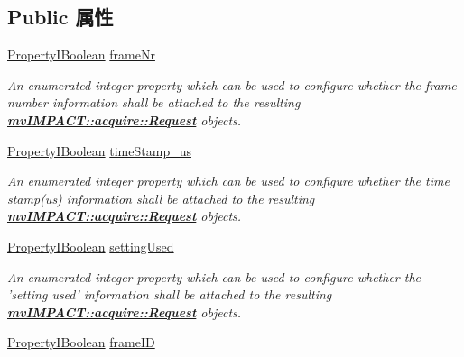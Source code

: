 \subsection*{Public 属性}
\begin{DoxyCompactItemize}
\item 
\hyperlink{group___common_interface_ga44f9437e24b21b6c93da9039ec6786aa}{Property\+I\+Boolean} \hyperlink{classmv_i_m_p_a_c_t_1_1acquire_1_1_request_info_configuration_af09762397b7527006125da34612a33a3}{frame\+Nr}
\begin{DoxyCompactList}\small\item\em An enumerated integer property which can be used to configure whether the frame number information shall be attached to the resulting {\bfseries \hyperlink{classmv_i_m_p_a_c_t_1_1acquire_1_1_request}{mv\+I\+M\+P\+A\+C\+T\+::acquire\+::\+Request}} objects. \end{DoxyCompactList}\item 
\hyperlink{group___common_interface_ga44f9437e24b21b6c93da9039ec6786aa}{Property\+I\+Boolean} \hyperlink{classmv_i_m_p_a_c_t_1_1acquire_1_1_request_info_configuration_a2124f5ba9dc92108fcdb6fe83dd2b9f5}{time\+Stamp\+\_\+us}
\begin{DoxyCompactList}\small\item\em An enumerated integer property which can be used to configure whether the time stamp(us) information shall be attached to the resulting {\bfseries \hyperlink{classmv_i_m_p_a_c_t_1_1acquire_1_1_request}{mv\+I\+M\+P\+A\+C\+T\+::acquire\+::\+Request}} objects. \end{DoxyCompactList}\item 
\hyperlink{group___common_interface_ga44f9437e24b21b6c93da9039ec6786aa}{Property\+I\+Boolean} \hyperlink{classmv_i_m_p_a_c_t_1_1acquire_1_1_request_info_configuration_a88dae33b051b11e4c1b9c51f1cb9b05b}{setting\+Used}
\begin{DoxyCompactList}\small\item\em An enumerated integer property which can be used to configure whether the 'setting used' information shall be attached to the resulting {\bfseries \hyperlink{classmv_i_m_p_a_c_t_1_1acquire_1_1_request}{mv\+I\+M\+P\+A\+C\+T\+::acquire\+::\+Request}} objects. \end{DoxyCompactList}\item 
\hyperlink{group___common_interface_ga44f9437e24b21b6c93da9039ec6786aa}{Property\+I\+Boolean} \hyperlink{classmv_i_m_p_a_c_t_1_1acquire_1_1_request_info_configuration_a9812a8596071f94151cf537b8f130c47}{frame\+I\+D}

\end{DoxyCompactItemize}
